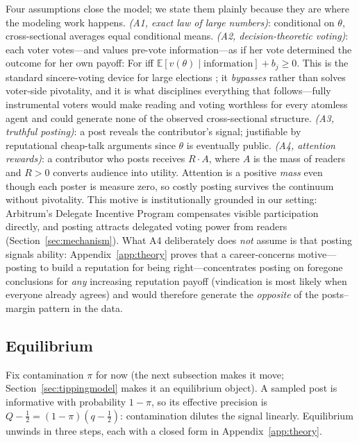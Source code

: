 \documentclass[12pt]{article}
\begin{document}
Four assumptions close the model; we state them plainly because they are where the modeling work happens. \emph{(A1, exact law of large numbers)}: conditional on $\theta$, cross-sectional averages equal conditional means. \emph{(A2, decision-theoretic voting)}: each voter votes---and values pre-vote information---as if her vote determined the outcome for her own payoff: For iff $\mathbb{E}[v(\theta) \mid \text{information}] + b_j \ge 0$. This is the standard sincere-voting device for large elections \citep[e.g.,][]{feddersen1996}; it \emph{bypasses} rather than solves voter-side pivotality, and it is what disciplines everything that follows---fully instrumental voters would make reading and voting worthless for every atomless agent and could generate none of the observed cross-sectional structure. \emph{(A3, truthful posting)}: a post reveals the contributor's signal; justifiable by reputational cheap-talk arguments since $\theta$ is eventually public. \emph{(A4, attention rewards)}: a contributor who posts receives $R \cdot A$, where $A$ is the mass of readers and $R > 0$ converts audience into utility. Attention is a positive \emph{mass} even though each poster is measure zero, so costly posting survives the continuum without pivotality. This motive is institutionally grounded in our setting: Arbitrum's Delegate Incentive Program compensates visible participation directly, and posting attracts delegated voting power from readers (Section~\ref{sec:mechanism}). What A4 deliberately does \emph{not} assume is that posting signals ability: Appendix~\ref{app:theory} proves that a career-concerns motive---posting to build a reputation for being right---concentrates posting on foregone conclusions for \emph{any} increasing reputation payoff (vindication is most likely when everyone already agrees) and would therefore generate the \emph{opposite} of the posts--margin pattern in the data.

\subsection{Equilibrium}
\label{sec:equilibrium}

Fix contamination $\pi$ for now (the next subsection makes it move; Section~\ref{sec:tippingmodel} makes it an equilibrium object). A sampled post is informative with probability $1-\pi$, so its effective precision is $Q - \tfrac12 = (1-\pi)(q - \tfrac12)$: contamination dilutes the signal linearly. Equilibrium unwinds in three steps, each with a closed form in Appendix~\ref{app:theory}.
\end{document}

